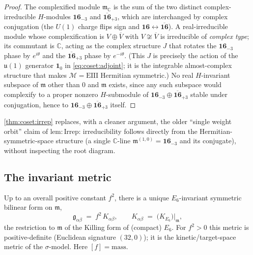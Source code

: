\begin{proof}
The complexified module $\mathfrak m_{\mathbb C}$ is the sum of the two distinct
complex-irreducible $H$-modules $\mathbf{16}_{-3}$ and
$\overline{\mathbf{16}}_{+3}$, which are interchanged by complex conjugation
(the $U(1)$ charge flips sign and $\mathbf{16}\leftrightarrow\overline{\mathbf{16}}$).
A real-irreducible module whose complexification is $V\oplus\overline V$ with
$V\not\cong\overline V$ is irreducible of \emph{complex type}; its commutant is
$\mathbb C$, acting as the complex structure $J$ that rotates the
$\mathbf{16}_{-3}$ phase by $e^{i\theta}$ and the $\overline{\mathbf{16}}_{+3}$
phase by $e^{-i\theta}$. (This $J$ is precisely the action of the $\mathfrak u(1)$
generator $\mathbf 1_{0}$ in \eqref{eq:coset:adjoint}; it is the integrable
almost-complex structure that makes $\mathcal M=\mathrm{EIII}$ Hermitian
symmetric.) No real $H$-invariant subspace of $\mathfrak m$ other than $0$ and
$\mathfrak m$ exists, since any such subspace would complexify to a proper
nonzero $H$-submodule of $\mathbf{16}_{-3}\oplus\overline{\mathbf{16}}_{+3}$
stable under conjugation, hence to $\mathbf{16}_{-3}\oplus\overline{\mathbf{16}}_{+3}$
itself.
\end{proof}

\begin{remark}\label{rem:coset:hermitian}
\autoref{thm:coset:irrep} replaces, with a cleaner argument, the older
``single weight orbit'' claim of $\mathrm{lem}{:}\mathrm{Irrep}$: irreducibility
follows directly from the Hermitian-symmetric-space structure (a single
$\mathbb C$-line $\mathfrak m^{(1,0)} = \mathbf{16}_{-3}$ and its conjugate),
without inspecting the root diagram.
\end{remark}

\subsection{The invariant metric}
\label{sec:coset:metric}

\begin{theorem}\label{thm:coset:metric}
\label{thm:uniqueMetric}
\label{thm:InvariantMetric}
Up to an overall positive constant $f^{2}$, there is a unique $E_{6}$-invariant
symmetric bilinear form on $\mathfrak m$,
\begin{equation}\label{eq:coset:metric}
  \mathfrak g_{\alpha\beta} \;=\; f^{2}\,K_{\alpha\beta},
  \qquad
  K_{\alpha\beta} \;=\; \bigl(K_{E_{6}}\bigr)\big|_{\mathfrak m},
\end{equation}
the restriction to $\mathfrak m$ of the Killing form of (compact) $E_{6}$. For
$f^{2}>0$ this metric is positive-definite (Euclidean signature
$(32,0)$); it is the kinetic/target-space metric of the $\sigma$-model. Here
$[f] = \text{mass}$.
\end{theorem}

